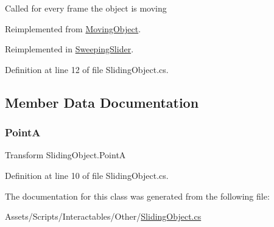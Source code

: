 Called for every frame the object is moving 



Reimplemented from \mbox{\hyperlink{class_moving_object_a3ee062f4d319649a0006bc58a9d7a620}{Moving\+Object}}.



Reimplemented in \mbox{\hyperlink{class_sweeping_slider_ac2a74d4cc8483404f577f51aef02589e}{Sweeping\+Slider}}.



Definition at line 12 of file Sliding\+Object.\+cs.



\subsection{Member Data Documentation}
\mbox{\label{class_sliding_object_a729c34668d902ec1a2d1bd3b3612ca97}} 
\subsubsection{\texorpdfstring{PointA}{PointA}}
{\footnotesize\ttfamily Transform Sliding\+Object.\+PointA}



Definition at line 10 of file Sliding\+Object.\+cs.



The documentation for this class was generated from the following file\+:\begin{DoxyCompactItemize}
\item 
Assets/\+Scripts/\+Interactables/\+Other/\mbox{\hyperlink{_sliding_object_8cs}{Sliding\+Object.\+cs}}\end{DoxyCompactItemize}

